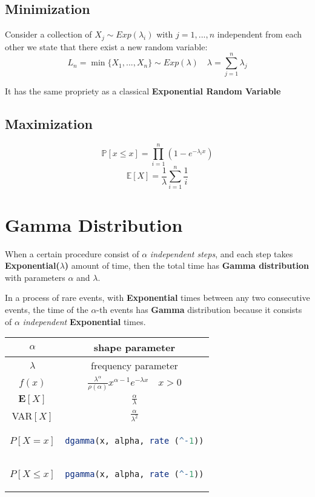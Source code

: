 \subsection{Minimization}
Consider a collection of \(X_j \sim Exp(\lambda_i)\) with \(j = 1,...,n\) independent from each other we state that there exist a new random variable:
\[L_n = \min\{X_1,...,X_n\} \sim Exp(\lambda) \quad \lambda = \sum_{j = 1}^n \lambda_j\]
\centerline{It has the same propriety as a classical \textbf{Exponential Random Variable}}

\subsection{Maximization}
\[\mathbb{P}[x \leq x] = \prod_{i = 1}^n (1-e^{-\lambda_ix})\]
\[\mathbb{E}[X] = \frac{1}{\lambda} \sum_{i=1}^n \frac{1}{i}\]

\section{Gamma Distribution}
\begin{tcolorbox}
When a certain procedure consist of \(\alpha\) \textit{independent steps}, and each step takes \textbf{Exponential(\(\lambda\))} amount of time, then the total time has \textbf{Gamma distribution} with parameters \(\alpha\) and \(\lambda\).

In a process of rare events, with \textbf{Exponential} times between any two consecutive events, the time of the \(\alpha\)-th events has \textbf{Gamma} distribution because it consists of \(\alpha\) \textit{independent} \textbf{Exponential} times.
\end{tcolorbox}

\begingroup
\setlength{\tabcolsep}{10pt} %
\renewcommand{\arraystretch}{1.5} %
\begin{center}
\begin{tabular}{ |c|c| } 
\hline
\(\alpha\) & shape parameter \\ \hline
\(\lambda\) & frequency parameter \\ \hline
\(f(x)\) & $\frac{\lambda^\alpha}{\rho(\alpha)}x^{\alpha - 1}e^{-\lambda x} \quad x > 0$ \\ \hline
\(\mathbf{E}[X]\) & \(\frac{\alpha}{\lambda}\) \\ \hline
VAR\([X]\) & \(\frac{\alpha}{\lambda^2}\) \\ \hline\hline
\(P[X = x]\) & \begin{lstlisting}[language=R]
dgamma(x, alpha, rate (^-1))
\end{lstlisting} \\ \hline
\(P[X \leq x]\) & \begin{lstlisting}[language=R]
pgamma(x, alpha, rate (^-1))
\end{lstlisting} \\ \hline
\end{tabular}
\end{center}
\endgroup

